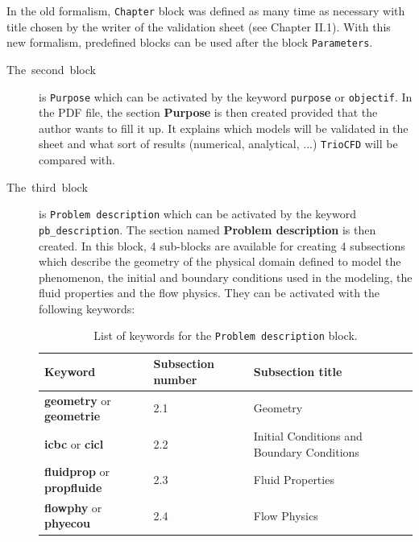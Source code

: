 In the old formalism, \texttt{Chapter} block was defined as many time as necessary with title chosen by the writer of the validation sheet (see Chapter II.1).
With this new formalism, predefined blocks can be used after the block \texttt{Parameters}.\smallskip\newline
\begin{description}
\item [{The~second~block}] is \texttt{Purpose} which can be activated
by the keyword \texttt{purpose} or \texttt{objectif}. In the PDF file,
the section \textbf{Purpose} is then created provided that the author
wants to fill it up. It explains which models will be validated in
the sheet and what sort of results (numerical, analytical, ...) \texttt{TrioCFD}
will be compared with.\smallskip\newline

\item [{The~third~block}] is \texttt{Problem description} which can be
activated by the keyword \texttt{pb\_description}. The section named
\textbf{Problem description} is then created. In this block, 4 sub-blocks
are available for creating 4 subsections which describe the geometry
of the physical domain defined to model the phenomenon, the initial
and boundary conditions used in the modeling, the fluid properties
and the flow physics. They can be activated with the following keywords:\smallskip\newline
\begin{table}[H]
\begin{centering}
\begin{tabular*}{16cm}{m{4.5cm} m{3cm} m{7.5cm}}
\hline 
\textbf{Keyword} & \textbf{Subsection number} & \textbf{Subsection title}\tabularnewline
\hline 
\textbf{geometry} or \textbf{geometrie} & 2.1 & Geometry\tabularnewline
\textbf{icbc} or \textbf{cicl} & 2.2 & Initial Conditions and Boundary Conditions\tabularnewline
\textbf{fluidprop} or \textbf{propfluide} & 2.3 & Fluid Properties\tabularnewline
\textbf{flowphy} or \textbf{phyecou} & 2.4 & Flow Physics\tabularnewline
\hline 
\end{tabular*}
\par\end{centering}
\caption{\label{tab:List-of-keyword-pbdes}List of keywords for the \texttt{Problem description} block.}
\end{table}


\end{description}
